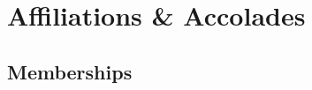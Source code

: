\documentclass[11pt,a4paper, final, factor=1100, stretch=18, shrink=18]{moderncv}
\newcommand{\spacesection}{\vspace{0.4cm}}
\newcommand{\spacesubsection}{\vspace{0.2cm}}
\begin{document}

\spacesection
\section{Affiliations \& Accolades}

\spacesubsection
\subsection{Memberships}
\end{document}
